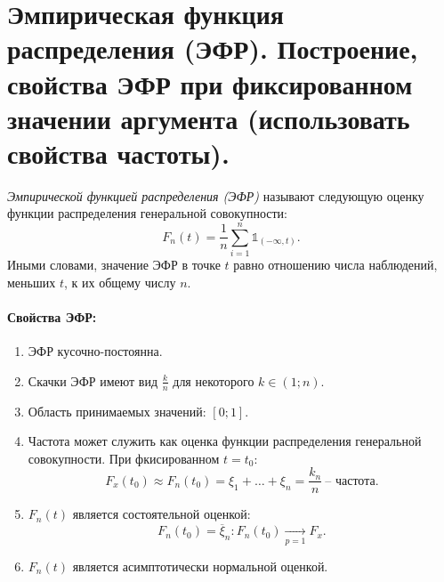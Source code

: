 \section{Эмпирическая функция распределения (ЭФР). Построение, свойства ЭФР при
фиксированном значении аргумента (использовать свойства частоты).}

\begin{definition}
    \textit{Эмпирической функцией распределения (ЭФР)} называют следующую оценку
    функции распределения генеральной совокупности:
    \[
        F_n(t) = \frac{1}{n} \sum_{i = 1}^{n} \mathbb{1}_{(-\infty, t)}
    .\]
    Иными словами, значение ЭФР в точке $t$ равно отношению числа наблюдений,
    меньших $t$, к их общему числу $n$.
\end{definition}

\paragraph{Свойства ЭФР:}

\begin{enumerate}
    \item ЭФР кусочно-постоянна.
    \item Скачки ЭФР имеют вид $\frac{k}{n}$ для некоторого $k \in (1; n)$.
    \item Область принимаемых значений: $[0; 1]$.
    \item Частота может служить как оценка функции распределения генеральной
        совокупности. При фкисированном $t = t_0$:
        \[
            F_x(t_0) \approx F_n(t_0) = \xi_1 + \ldots + \xi_n =
            \frac{k_n}{n}~ \text{-- частота}
        .\]
    \item $F_n(t)$ является состоятельной оценкой:
        \[
            F_n(t_0) = \overline{\xi}_n: F_n(t_0) \xrightarrow[p = 1]{} F_x
        .\]
    \item $F_n(t)$ является асимптотически нормальной оценкой.
\end{enumerate}
